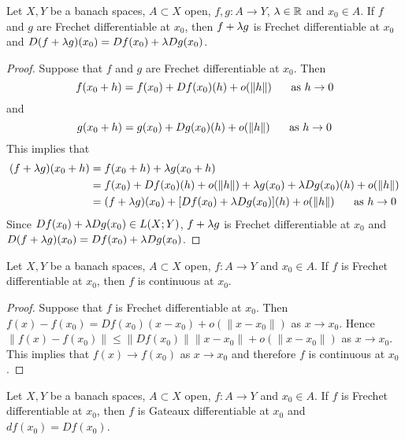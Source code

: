 \documentclass{book}
\begin{document}
	\begin{ex} 
	Let $X, Y$ be a banach spaces, $A \subset X$ open, $f,g:A \rightarrow Y$, $\lambda \in \mathbb{R}$ and $x_0 \in A$. If $f$ and $g$ are Frechet differentiable at $x_0$, then $f+ \lambda g$ is Frechet differentiable at $x_0$ and $D(f+\lambda g)(x_0) = Df(x_0) + \lambda Dg(x_0)$.
	\end{ex}
	
	\begin{proof}
	Suppose that $f$ and $g$ are Frechet differentiable at $x_0$. Then $$f(x_0 + h) = f(x_0) + Df(x_0)(h) + o(\|h\| ) \hspace{.5cm} \text{ as } h \rightarrow 0$$  and $$g(x_0 + h) = g(x_0) + Dg(x_0)(h) + o(\|h\| ) \hspace{.5cm} \text{ as } h \rightarrow 0$$  
	This implies that 
	\begin{align*}
	(f+\lambda g)(x_0 + h) 
	&= f(x_0 + h) +\lambda g(x_0 + h) \\
	&= f(x_0) + Df(x_0)(h) + o(\|h\| ) + \lambda g(x_0) + \lambda Dg(x_0)(h) + o(\|h\| ) \\
	&= (f+\lambda g)(x_0) + [Df(x_0)+ \lambda Dg(x_0)](h) + o(\|h\|) \hspace{.5cm} \text{ as } h \rightarrow 0
	\end{align*}
	Since $Df(x_0)+\lambda Dg(x_0) \in L(X; Y)$, $f+\lambda g$ is Frechet differentiable at $x_0$ and $D(f+\lambda g)(x_0) = Df(x_0) + \lambda Dg(x_0)$. 
	\end{proof}
	
	\begin{ex}
	Let $X, Y$ be a banach spaces, $A \subset X$ open, $f:A \rightarrow Y$ and $x_0 \in A$. If $f$ is Frechet differentiable at $x_0$, then $f$ is continuous at $x_0$. 
	\end{ex}
	
	\begin{proof}
	Suppose that $f$ is Frechet differentiable at $x_0$. Then $f(x) - f(x_0) = Df(x_0)(x - x_0) + o(\|x - x_0\|)$ as $x \rightarrow x_0$. Hence $\|f(x) - f(x_0)\| \leq \| Df(x_0)\| \|x - x_0 \| + o(\|x - x_0\|)$ as $x \rightarrow x_0$. This implies that $f(x) \rightarrow f(x_0)$ as $x \rightarrow x_0$ and therefore $f$ is continuous at $x_0$.
	\end{proof}
	
	\begin{ex} 
	Let $X, Y$ be a banach spaces, $A \subset X$ open, $f:A \rightarrow Y$ and $x_0 \in A$. If $f$ is Frechet differentiable at $x_0$, then $f$ is Gateaux differentiable at $x_0$ and $df(x_0) = Df(x_0)$.
	\end{ex}
	
\end{document}
